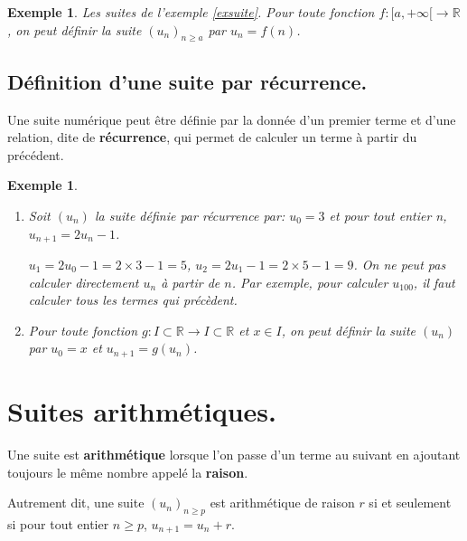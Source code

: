 \documentclass[a4paper,11pt]{article}
\theoremstyle{break}
\newcounter{enonce}
\newtheorem{exemple}[enonce]{Exemple}
\begin{document}
   \begin{exemple}
   
   Les suites de l'exemple \ref{exsuite}. Pour toute fonction $f:[a,+\infty[ \to \mathbb{R}$, on peut définir la suite
   $(u_n)_{n \geq a}$ par $u_n=f(n)$.
   
  \end{exemple}
  
   \subsection{Définition d'une suite par récurrence.}
  
   \begin{theorem}
      Une suite numérique peut être définie par la donnée d'un premier terme
      et d'une relation, dite de \textbf{récurrence}, qui permet de calculer 
      un terme à partir du précédent.
   \end{theorem}
   
    \begin{exemple}
    \begin{enumerate}
    \item
    Soit $(u_n)$ la suite définie par récurrence par: $u_0=3$ et pour tout entier n, $u_{n+1}=2u_n-1$.

  $u_1=2u_0-1=2 \times 3-1=5$, $u_2=2 u_1-1=2 \times 5-1=9$. On ne peut pas calculer
  directement $u_n$ à partir de $n$. Par exemple, pour calculer $u_{100}$, il 
  faut calculer tous les termes qui précèdent.
  
  \item Pour toute fonction $g:I \subset \mathbb{R}
  \to I \subset \mathbb{R}$ et $x \in I$, on peut définir la suite $(u_n)$ par $u_0=x$ et $u_{n+1}=g(u_n)$.
  \end{enumerate}
  
   \end{exemple}
   \newpage
  
  \section{Suites arithmétiques.}
  \begin{definition} 
    
   Une suite est \textbf{arithmétique} lorsque l'on passe d'un terme au suivant en ajoutant toujours le même nombre
   appelé la \textbf{raison}.
   
   Autrement dit, une suite $(u_n)_{n \geq p}$ est arithmétique de raison $r$ si et seulement si 
   pour tout entier $n \geq p$, $u_{n+1}=u_n+r$.
   \end{definition}
   
\end{document}
